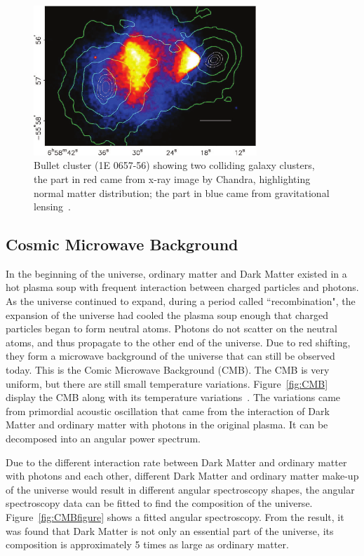\begin{figure}[!htb]
    \begin{center}
        \includegraphics[width=0.75\textwidth]{figures/chapter_DM/BulletCluster}
        \caption{
			Bullet cluster (1E 0657-56) showing two colliding galaxy clusters, the part in red came from x-ray image by Chandra, highlighting normal matter distribution; the part in blue came from gravitational lensing~\cite{BulletCluster}.
        }
        \label{fig:BulletCluster_figure}
    \end{center}
\end{figure}

\subsection{Cosmic Microwave Background}
\label{sec:CMB}
In the beginning of the universe, ordinary matter and Dark Matter existed in a hot plasma soup with frequent interaction between charged particles and photons. As the universe continued to expand, during a period called ``recombination", the expansion of the universe had cooled the plasma soup enough that charged particles began to form neutral atoms. Photons do not scatter on the neutral atoms, and thus propagate to the other end of the universe. Due to red shifting, they form a microwave
background of the universe that can still be observed today. This is the Comic Microwave Background (CMB). The CMB is very uniform, but there are still small temperature variations. Figure~\ref{fig:CMB} display the CMB along with its temperature variations~\cite{fixsen2009temperature}. The variations came from primordial acoustic oscillation that came from the interaction of Dark Matter and ordinary matter with photons in the original plasma. It can be decomposed into an angular power spectrum.

Due to the different interaction rate between Dark Matter and ordinary matter with photons and each other, different Dark Matter and ordinary matter make-up of the universe would result in different angular spectroscopy shapes, the angular spectroscopy data can be fitted to find the composition of the universe. Figure~\ref{fig:CMBfigure} shows a fitted angular spectroscopy. From the result, it was found that Dark Matter is not only an essential part of the universe, its composition is approximately 5 times as large as ordinary matter. 

